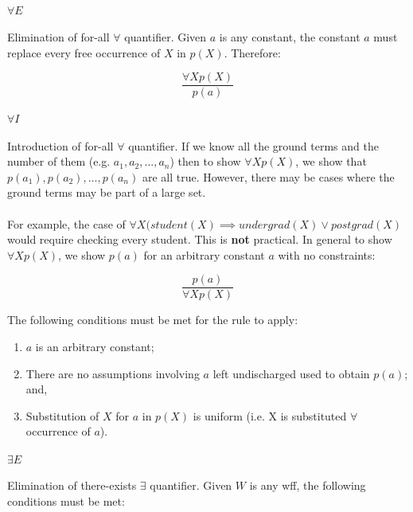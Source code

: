 \documentclass{article}
\begin{document}
\begin{multicols}{2}
    \paragraph{$\forall E$} Elimination of for-all $\forall$ quantifier. Given $a$ is any constant, the constant $a$ must replace every free occurrence of $X$ in $p(X)$. Therefore:
  
  \begin{equation*}  
  \frac{\forall X p(X)}{p(a)}
  \end{equation*}
  
    \paragraph{$\forall I$} Introduction of for-all $\forall$ quantifier. If we know all the ground terms and the number of them (e.g. $a_1, a_2, ..., a_n$) then to show $\forall X p(X)$, we show that $p(a_1), p(a_2), ..., p(a_n)$ are all true. However, there may be cases where the ground terms may be part of a large set.
    
    \paragraph{} For example, the case of $\forall X (student(X) \implies undergrad(X) \lor postgrad(X)$ would require checking every student. This is {\bf not} practical. In general to show $\forall X p(X)$, we show $p(a)$ for an arbitrary constant $a$ with no constraints:
  
  \begin{equation*}  
  \frac{p(a)}{\forall X p(X)}
  \end{equation*}
  
  The following conditions must be met for the rule to apply:
  
  \begin{enumerate}
  \item $a$ is an arbitrary constant;
  \item There are no assumptions involving $a$ left undischarged used to obtain $p(a)$; and,
  \item Substitution of $X$ for $a$ in $p(X)$ is uniform (i.e. X is substituted $\forall$ occurrence of $a$).
  \end{enumerate}
  
  \paragraph{$\exists E$} Elimination of there-exists $\exists$ quantifier. Given $W$ is any wff, the following conditions must be met:
  

\end{multicols}
\end{document}
